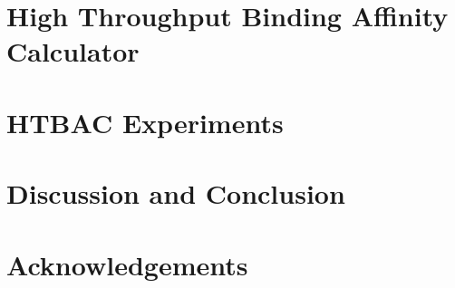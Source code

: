 \documentclass[conference]{IEEEtran}
\begin{document}
\section{High Throughput Binding Affinity Calculator}\label{sec:htbac}



\section{HTBAC Experiments}\label{sec:6}



\section{Discussion and Conclusion}\label{sec:conclusion}



\section*{Acknowledgements}





\end{document}
